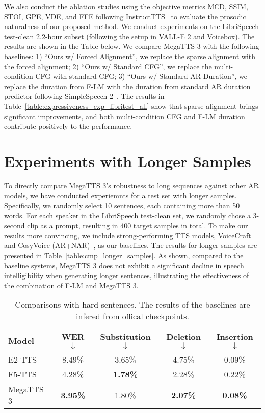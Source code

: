 We also conduct the ablation studies using the objective metrics MCD, SSIM, STOI, GPE, VDE, and FFE following InstructTTS~\citep{yang2024instructtts} to evaluate the prosodic naturalness of our proposed method. We conduct experiments on the LibriSpeech test-clean 2.2-hour subset (following the setup in VALL-E 2 and Voicebox). The results are shown in the Table below. We compare MegaTTS 3 with the following baselines: 1) ``Ours w/ Forced Alignment'', we replace the sparse alignment with the forced alignment; 2) ``Ours w/ Standard CFG'', we replace the multi-condition CFG with standard CFG; 3) ``Ours w/ Standard AR Duration'', we replace the duration from F-LM with the duration from standard AR duration predictor following SimpleSpeech 2~\citep{yang2024simplespeech2}. The results in Table~\ref{table:expressiveness_exp_libritest_all} show that sparse alignment brings significant improvements, and both multi-condition CFG and F-LM duration contribute positively to the performance.


\section{Experiments with Longer Samples}
\label{app:exp_longer_samples}
To directly compare MegaTTS 3's robustness to long sequences against other AR models, we have conducted experiemnts for a test set with longer samples. Specifically, we randomly select 10 sentences, each containing more than 50 words. For each speaker in the LibriSpeech test-clean set, we randomly chose a 3-second clip as a prompt, resulting in 400 target samples in total. To make our results more convincing, we include strong-performing TTS models, VoiceCraft~\citep{peng2024voicecraft} and CosyVoice (AR+NAR)~\citep{du2024cosyvoice}, as our baselines. The results for longer samples are presented in Table~\ref{table:cmp_longer_samples}. As shown, compared to the baseline systems, MegaTTS 3 does not exhibit a significant decline in speech intelligibility when generating longer sentences, illustrating the effectiveness of the combination of F-LM and MegaTTS 3.


\begin{table*}[!ht]
\small
\centering
\begin{tabular}{@{}l|cccc@{}}
\toprule
\bfseries Model & \bfseries WER$\downarrow$ & \bfseries Substitution$\downarrow$ & \bfseries Deletion$\downarrow$& \bfseries Insertion$\downarrow$ \\       
\midrule
E2-TTS       &  8.49\%   & 3.65\% & 4.75\% & 0.09\% \\
F5-TTS       &  4.28\%   & \bfseries 1.78\% & 2.28\% & 0.22\% \\
MegaTTS 3        &  \bfseries 3.95\%   & 1.80\% & \bfseries 2.07\% & \bfseries 0.08\% \\
\bottomrule
\end{tabular}
\caption{Comparisons with hard sentences. The results of the baselines are infered from offical
checkpoints.}
\label{table:cmp_hard_sentences}
\end{table*}


